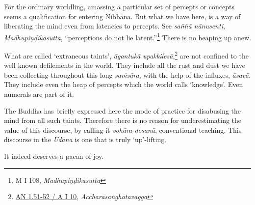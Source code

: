 For the ordinary worldling, amassing a particular set of percepts or concepts seems a qualification for entering Nibbāna. But what we have here, is a way of liberating the mind even from latencies to percepts. See \emph{saññā nānusenti}, \emph{Madhupiṇḍikasutta}, ``perceptions do not lie latent.''\footnote{M I 108, \emph{Madhupiṇḍikasutta}} There is no heaping up anew.

What are called `extraneous taints', \emph{āgantukā upakkilesā},\footnote{\href{https://suttacentral.net/an1.51-60/pli/ms}{AN 1.51-52 / A I 10}, \emph{Accharāsaṅghātavagga}} are not confined to the well known defilements in the world. They include all the rust and dust we have been collecting throughout this long \emph{saṁsāra}, with the help of the influxes, \emph{āsavā}. They include even the heap of percepts which the world calls `knowledge'. Even numerals are part of it.

The Buddha has briefly expressed here the mode of practice for disabusing the mind from all such taints. Therefore there is no reason for underestimating the value of this discourse, by calling it \emph{vohāra desanā}, conventional teaching. This discourse in the \emph{Udāna} is one that is truly `up'-lifting.

It indeed deserves a paean of joy.
